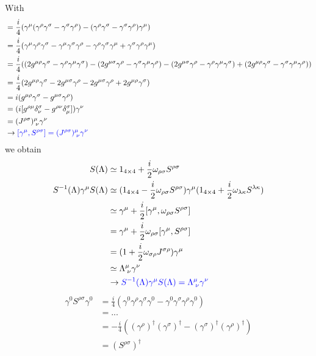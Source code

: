 \documentclass[10pt,a4paper]{report}
\theoremstyle{definition}
\begin{document}
With
\begin{align}
[\gamma^\mu,S^{\rho\sigma}]
&=\frac{i}{4}(\gamma^\mu(\gamma^\rho\gamma^\sigma-\gamma^\sigma\gamma^\rho)-(\gamma^\rho\gamma^\sigma-\gamma^\sigma\gamma^\rho)\gamma^\mu)\\
&=\frac{i}{4}(\gamma^\mu\gamma^\rho\gamma^\sigma-\gamma^\mu\gamma^\sigma\gamma^\rho-\gamma^\rho\gamma^\sigma\gamma^\mu+\gamma^\sigma\gamma^\rho\gamma^\mu)\\
&=\frac{i}{4}(
(2g^{\mu\rho}\gamma^\sigma-\gamma^\rho\gamma^\mu\gamma^\sigma)
-(2g^{\mu\sigma}\gamma^\rho-\gamma^\sigma\gamma^\mu\gamma^\rho)
-(2g^{\mu\sigma}\gamma^\rho-\gamma^\rho\gamma^\mu\gamma^\sigma)
+(2g^{\mu\rho}\gamma^\sigma-\gamma^\sigma\gamma^\mu\gamma^\rho))\\
&=\frac{i}{4}(
2g^{\mu\rho}\gamma^\sigma
-2g^{\mu\sigma}\gamma^\rho
-2g^{\mu\sigma}\gamma^\rho
+2g^{\mu\rho}\gamma^\sigma)\\
&=i(g^{\mu\rho}\gamma^\sigma-g^{\mu\sigma}\gamma^\rho)\\
&=(i[g^{\rho\mu}\delta^\sigma_\nu-g^{\rho\nu}\delta^\sigma_\mu])\gamma^\nu\\
&=(J^{\rho\sigma})^\mu_{\;\nu}\gamma^\nu\\
&\rightarrow\textcolor{blue}{ [\gamma^\mu,S^{\rho\sigma}]=(J^{\rho\sigma})^\mu_{\;\nu}\gamma^\nu}
\end{align}
we obtain
\begin{align}
S(\Lambda)
&\simeq1_{4\times4}+\frac{i}{2}\omega_{\rho\sigma}S^{\rho\sigma}\\
S^{-1}(\Lambda)\gamma^\mu S(\Lambda)
&\simeq(1_{4\times4}-\frac{i}{2}\omega_{\rho\sigma}S^{\rho\sigma})\gamma^\mu(1_{4\times4}+\frac{i}{2}\omega_{\lambda\kappa}S^{\lambda\kappa})\\
&\simeq\gamma^\mu+\frac{i}{2}[\gamma^\mu,\omega_{\rho\sigma}S^{\rho\sigma}]\\
&=\gamma^\mu+\frac{i}{2}\omega_{\rho\sigma}[\gamma^\mu,S^{\rho\sigma}]\\
&=(1+\frac{i}{2}\omega_{\sigma\rho}J^{\sigma\rho})\gamma^\mu\\
&\simeq\Lambda^\mu_{\;\nu}\gamma^\nu\\
&\rightarrow\textcolor{blue}{S^{-1}(\Lambda)\gamma^\mu S(\Lambda)=\Lambda^\mu_{\;\nu}\gamma^\nu}
\end{align}
\begin{align}
\gamma^0S^{\rho\sigma}\gamma^0&=\frac{i}{4}(\gamma^0\gamma^\rho\gamma^\sigma\gamma^0-\gamma^0\gamma^\sigma\gamma^\rho\gamma^0)\\
&=...\\
&=-\frac{i}{4}((\gamma^\rho)^\dagger(\gamma^\sigma)^\dagger-(\gamma^\sigma)^\dagger(\gamma^\rho)^\dagger)\\
&=(S^{\rho\sigma})^\dagger
\end{align}
\end{document}
